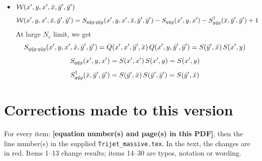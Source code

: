 \documentclass[9pt]{article}
\numberwithin{equation}{section}
\begin{document}
\begin{itemize}
\item $\mathcal{W}(x',y,x',\Bar{x},\Bar{y}',\Bar{y}')$
    \begin{align}
        \mathcal{W}(x',y,x',\Bar{x},\Bar{y}',\Bar{y}') & = S_{q\Bar{q}g\,q\Bar{q}g}(x',y,x',\Bar{x},\Bar{y}',\Bar{y}') -S_{q\Bar{q}g}(x',y,x') - S^{\dagger}_{q\Bar{q}g}(\Bar{x},\Bar{y}',\Bar{y}') + 1
    \end{align}
At large $N_{c}$ limit, we get
$$S_{q\Bar{q}g\,q\Bar{q}g}(x',y,x',\Bar{x},\Bar{y}',\Bar{y}') = Q(x',x',\Bar{y}',\Bar{x})\, Q(x',y,\Bar{y}',\Bar{y}') = S(\Bar{y}',\Bar{x})\, S(x',y) $$
$$S_{q\Bar{q}g}(x',y,x') = S(x',x')\, S(x',y) = S(x',y)$$
$$S^{\dagger}_{q\Bar{q}g}(\Bar{x},\Bar{y}',\Bar{y}') = S(\Bar{y}',\Bar{x})\, S(\Bar{y}',\Bar{y}') = S(\Bar{y}',\Bar{x}) $$
\end{itemize}

\appendix
\section{Corrections made to this version}\label{app:corr}
For every item: \textbf{[equation number(s) and page(s) in this PDF]}, then the line number(s) in the supplied \texttt{Trijet\_massive.tex}. In the text, the changes are in {\color{red}red}. Items 1--13 change results; items 14--30 are typos, notation or wording.
\end{document}
